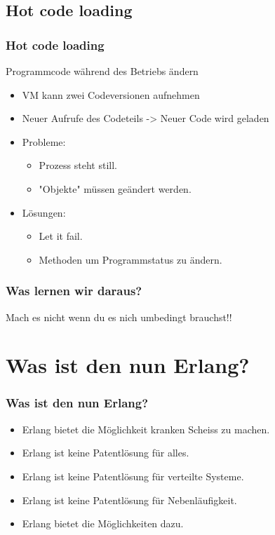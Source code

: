 \documentclass{beamer}
\begin{document}
\subsection{Hot code loading}
\begin{frame} %
  \frametitle{Hot code loading} %
  \begin{Definition}
    Programmcode während des Betriebs ändern
  \end{Definition}
  \begin{itemize} %
    \item VM kann zwei Codeversionen aufnehmen
    \item Neuer Aufrufe des Codeteils -> Neuer Code wird geladen
    \item Probleme:
      \begin{itemize}
        \item Prozess steht still.
        \item "Objekte" müssen geändert werden.
      \end{itemize}
    \item Lösungen:
      \begin{itemize}
        \item Let it fail.
        \item Methoden um Programmstatus zu ändern.
      \end{itemize}
  \end{itemize}
\end{frame}

\begin{frame} %
  \frametitle{Was lernen wir daraus?} %
  Mach es nicht wenn du es nich umbedingt brauchst!!
\end{frame}

\section{Was ist den nun Erlang?}
\begin{frame} %
  \frametitle{Was ist den nun Erlang?} %
  \begin{itemize} %
    \item Erlang bietet die Möglichkeit kranken Scheiss zu machen.
    \item Erlang ist keine Patentlösung für alles.
    \item Erlang ist keine Patentlösung für verteilte Systeme.
    \item Erlang ist keine Patentlösung für Nebenläufigkeit.
    \item Erlang bietet die Möglichkeiten dazu.
  \end{itemize}
\end{frame}
\end{document}
